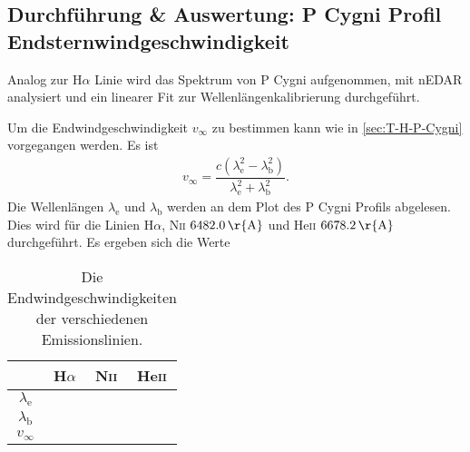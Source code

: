 \subsection{Durchführung \& Auswertung: P Cygni Profil\\Endsternwindgeschwindigkeit}
Analog zur H$\alpha $ Linie wird das Spektrum von P Cygni aufgenommen, mit nEDAR analysiert und ein linearer Fit zur Wellenlängenkalibrierung durchgeführt.

Um die Endwindgeschwindigkeit $v_\infty$ zu bestimmen kann wie in \ref{sec:T-H-P-Cygni} vorgegangen werden.
Es ist
\begin{align} 
  v_\infty=\dfrac{c\left(\lambda _\text{e}^2-\lambda _\text{b}^2\right)}{\lambda _\text{e}^2+\lambda _\text{b}^2}
.\end{align} 
Die Wellenlängen $\lambda _\text{e}$ und $\lambda _\text{b}$ werden an dem Plot des P Cygni Profils abgelesen.
Dies wird für die Linien H$\alpha$, N\textsc{ii} $\SI{6482,0}{\r{A}}$ und He\textsc{ii} $\SI{6678,2}{\r{A}}$ durchgeführt.  
Es ergeben sich die Werte
\begin{table}[h]
  \begin{tabular}{cccc}
    \toprule
    & H$\alpha$ & N\textsc{ii} & He\textsc{ii}\\
    \midrule
    $\lambda _\text{e}$ & & &\\
    $\lambda _\text{b}$ & & &\\
    $v_\infty$ & & &\\
    \bottomrule
  \end{tabular}
  \caption{Die Endwindgeschwindigkeiten der verschiedenen Emissionslinien.} \label{tab:vinf}
\end{table}
